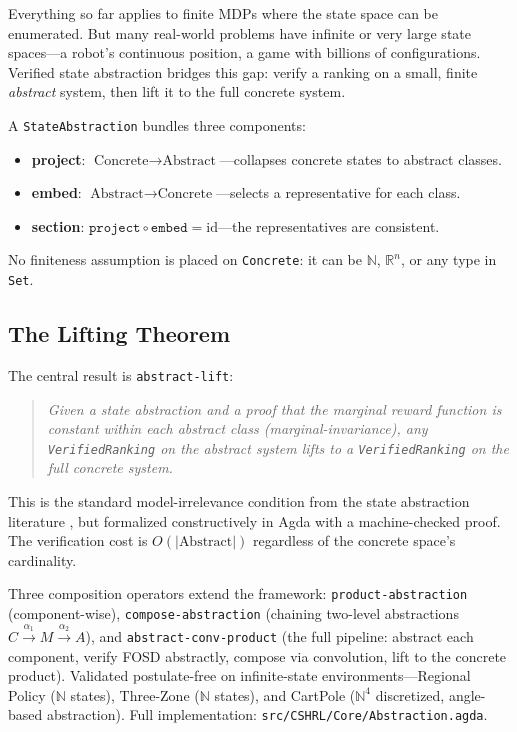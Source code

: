 \documentclass[runningheads]{llncs}
\newcommand{\fpath}[1]{\nolinkurl{#1}}
\begin{document}
Everything so far applies to finite MDPs where the state space can be enumerated.  But many real-world problems have infinite or very large state spaces---a robot's continuous position, a game with billions of configurations.  Verified state abstraction bridges this gap: verify a ranking on a small, finite \emph{abstract} system, then lift it to the full concrete system.

A \texttt{StateAbstraction} bundles three components:

\begin{itemize}
\item \textbf{project}: $\text{Concrete} \to \text{Abstract}$---collapses concrete states to abstract classes.
\item \textbf{embed}: $\text{Abstract} \to \text{Concrete}$---selects a representative for each class.
\item \textbf{section}: $\texttt{project} \circ \texttt{embed} = \text{id}$---the representatives are consistent.
\end{itemize}

\noindent No finiteness assumption is placed on \texttt{Concrete}: it can be $\mathbb{N}$, $\mathbb{R}^n$, or any type in \texttt{Set}.

\subsection{The Lifting Theorem}

The central result is \texttt{abstract-lift}:

\begin{quote}
\emph{Given a state abstraction and a proof that the marginal reward function is constant within each abstract class (marginal-invariance), any \texttt{VerifiedRanking} on the abstract system lifts to a \texttt{VerifiedRanking} on the full concrete system.}
\end{quote}

\noindent This is the standard model-irrelevance condition from the state abstraction literature \cite{Li2006}, but formalized constructively in Agda with a machine-checked proof.  The verification cost is $O(|\text{Abstract}|)$ regardless of the concrete space's cardinality.

Three composition operators extend the framework: \texttt{product-abstraction} (component-wise), \texttt{compose-abstraction} (chaining two-level abstractions $C \xrightarrow{\alpha_1} M \xrightarrow{\alpha_2} A$), and \texttt{abstract-conv-product} (the full pipeline: abstract each component, verify FOSD abstractly, compose via convolution, lift to the concrete product).  Validated postulate-free on infinite-state environments---Regional Policy ($\mathbb{N}$ states), Three-Zone ($\mathbb{N}$ states), and CartPole ($\mathbb{N}^4$ discretized, angle-based abstraction).  Full implementation: \fpath{src/CSHRL/Core/Abstraction.agda}.
\end{document}
